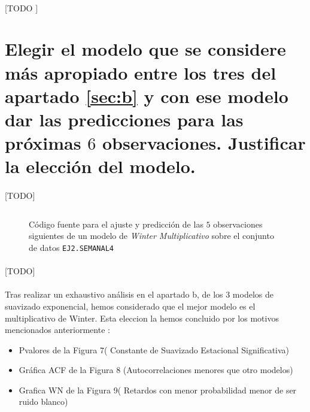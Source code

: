 \documentclass[a4paper, spanish]{article}
\begin{document}
    \paragraph{}
    [TODO ]

  \section{Elegir el modelo que se considere más apropiado entre los tres del apartado \ref{sec:b} y con ese modelo dar las predicciones para las próximas $6$ observaciones. Justificar la elección del modelo.}
  \label{sec:c}

    \paragraph{}
    [TODO]

    \begin{figure}[htb!]
      \centering
      \inputminted{SAS}{./res/code/c-01-prediction.sas}
      \caption{Código fuente para el ajuste y predicción de las $5$ observaciones siguientes de un modelo de \emph{Winter Multiplicativo} sobre el conjunto de datos \texttt{EJ2.SEMANAL4}}
      \label{code:winter_multiplicative_prediction}
    \end{figure}

    \paragraph{}
    [TODO]

    \paragraph{}
    Tras realizar un exhaustivo análisis en el apartado b, de los 3 modelos de suavizado exponencial, hemos considerado que el mejor modelo es el multiplicativo de Winter.
    Esta eleccion la hemos concluido por los motivos mencionados anteriormente :

    \begin{itemize}
      \item Pvalores de la Figura 7( Constante de Suavizado Estacional Significativa)
      \item Gráfica ACF de la Figura 8 (Autocorrelaciones menores que otro modelos)
      \item Grafica WN de la Figura 9( Retardos con menor probabilidad menor de ser ruido blanco)
    \end{itemize}
\end{document}
